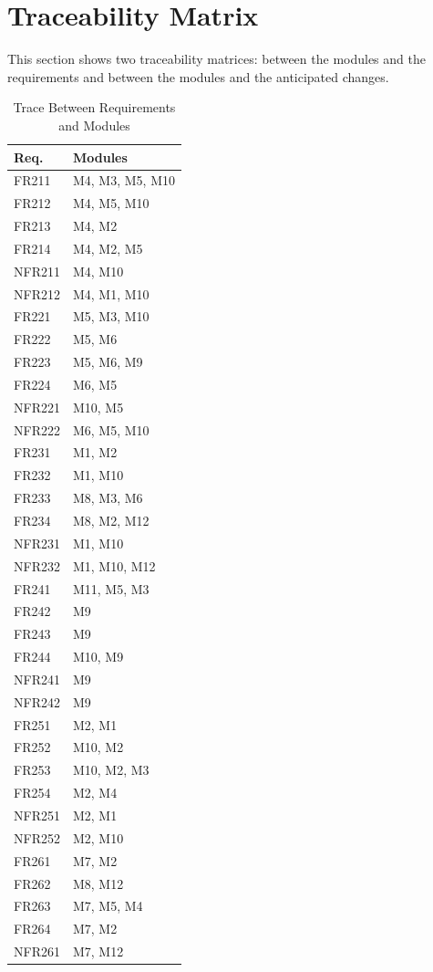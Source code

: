 \section{Traceability Matrix} \label{SecTM}

This section shows two traceability matrices: between the modules and the
requirements and between the modules and the anticipated changes.

\begin{table}[H]
\centering
\begin{tabular}{p{} p{}}
\toprule
\textbf{Req.} & \textbf{Modules}\\
\midrule
FR211 & M4, M3, M5, M10\\
FR212 & M4, M5, M10\\
FR213 & M4, M2\\
FR214 & M4, M2, M5\\
NFR211 & M4, M10\\
NFR212 & M4, M1, M10\\
FR221 & M5, M3, M10\\
FR222 & M5, M6\\
FR223 & M5, M6, M9\\
FR224 & M6, M5\\
NFR221 & M10, M5\\
NFR222 & M6, M5, M10\\
FR231 & M1, M2\\
FR232 & M1, M10\\
FR233 & M8, M3, M6\\
FR234 & M8, M2, M12\\
NFR231 & M1, M10\\
NFR232 & M1, M10, M12\\
FR241 & M11, M5, M3\\
FR242 & M9\\
FR243 & M9\\
FR244 & M10, M9\\
NFR241 & M9\\
NFR242 & M9\\
FR251 & M2, M1\\
FR252 & M10, M2\\
FR253 & M10, M2, M3\\
FR254 & M2, M4\\
NFR251 & M2, M1\\
NFR252 & M2, M10\\
FR261 & M7, M2\\
FR262 & M8, M12\\
FR263 & M7, M5, M4\\
FR264 & M7, M2\\
NFR261 & M7, M12\\



\bottomrule
\end{tabular}
\caption{Trace Between Requirements and Modules}
\label{TblRT}
\end{table}

